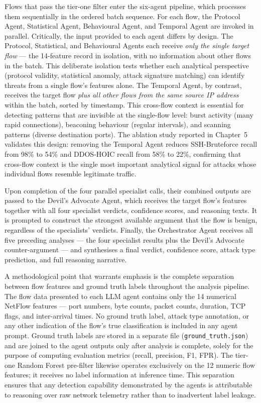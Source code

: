 \documentclass[../main.tex]{subfiles}
\begin{document}
Flows that pass the tier-one filter enter the six-agent pipeline, which processes them sequentially in the ordered batch sequence. For each flow, the Protocol Agent, Statistical Agent, Behavioural Agent, and Temporal Agent are invoked in parallel. Critically, the input provided to each agent differs by design. The Protocol, Statistical, and Behavioural Agents each receive \emph{only the single target flow} --- the 14-feature record in isolation, with no information about other flows in the batch. This deliberate isolation tests whether each analytical perspective (protocol validity, statistical anomaly, attack signature matching) can identify threats from a single flow's features alone. The Temporal Agent, by contrast, receives the target flow \emph{plus all other flows from the same source IP address} within the batch, sorted by timestamp. This cross-flow context is essential for detecting patterns that are invisible at the single-flow level: burst activity (many rapid connections), beaconing behaviour (regular intervals), and scanning patterns (diverse destination ports). The ablation study reported in Chapter~5 validates this design: removing the Temporal Agent reduces SSH-Bruteforce recall from 98\% to 54\% and DDOS-HOIC recall from 58\% to 22\%, confirming that cross-flow context is the single most important analytical signal for attacks whose individual flows resemble legitimate traffic.

Upon completion of the four parallel specialist calls, their combined outputs are passed to the Devil's Advocate Agent, which receives the target flow's features together with all four specialist verdicts, confidence scores, and reasoning texts. It is prompted to construct the strongest available argument that the flow is benign, regardless of the specialists' verdicts. Finally, the Orchestrator Agent receives all five preceding analyses --- the four specialist results plus the Devil's Advocate counter-argument --- and synthesises a final verdict, confidence score, attack type prediction, and full reasoning narrative.

A methodological point that warrants emphasis is the complete separation between flow features and ground truth labels throughout the analysis pipeline. The flow data presented to each LLM agent contains only the 14 numerical NetFlow features --- port numbers, byte counts, packet counts, duration, TCP flags, and inter-arrival times. No ground truth label, attack type annotation, or any other indication of the flow's true classification is included in any agent prompt. Ground truth labels are stored in a separate file (\texttt{ground\_truth.json}) and are joined to the agent outputs only after analysis is complete, solely for the purpose of computing evaluation metrics (recall, precision, F1, FPR). The tier-one Random Forest pre-filter likewise operates exclusively on the 12 numeric flow features; it receives no label information at inference time. This separation ensures that any detection capability demonstrated by the agents is attributable to reasoning over raw network telemetry rather than to inadvertent label leakage.
\end{document}
